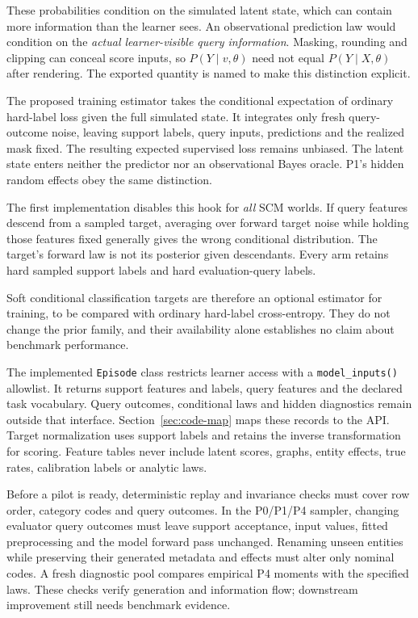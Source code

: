 \documentclass[11pt]{article}
\begin{document}
These probabilities condition on the simulated latent state, which can contain more information than the learner sees. An observational prediction law would condition on the \emph{actual learner-visible query information}. Masking, rounding and clipping can conceal score inputs, so $P(Y\mid v,\theta)$ need not equal $P(Y\mid X,\theta)$ after rendering. The exported quantity is named  to make this distinction explicit.

The proposed training estimator takes the conditional expectation of ordinary hard-label loss given the full simulated state. It integrates only fresh query-outcome noise, leaving support labels, query inputs, predictions and the realized mask fixed. The resulting expected supervised loss remains unbiased. The latent state enters neither the predictor nor an observational Bayes oracle. P1's hidden random effects obey the same distinction.

The first implementation disables this hook for \emph{all} SCM worlds. If query features descend from a sampled target, averaging over forward target noise while holding those features fixed generally gives the wrong conditional distribution. The target's forward law is not its posterior given descendants. Every arm retains hard sampled support labels and hard evaluation-query labels.

Soft conditional classification targets are therefore an optional estimator for training, to be compared with ordinary hard-label cross-entropy. They do not change the prior family, and their availability alone establishes no claim about benchmark performance.

The implemented \texttt{Episode} class restricts learner access with a \texttt{model\_inputs()} allowlist. It returns support features and labels, query features and the declared task vocabulary. Query outcomes, conditional laws and hidden diagnostics remain outside that interface. Section~\ref{sec:code-map} maps these records to the API. Target normalization uses support labels and retains the inverse transformation for scoring. Feature tables never include latent scores, graphs, entity effects, true rates, calibration labels or analytic laws.

Before a pilot is ready, deterministic replay and invariance checks must cover row order, category codes and query outcomes. In the P0/P1/P4 sampler, changing evaluator query outcomes must leave support acceptance, input values, fitted preprocessing and the model forward pass unchanged. Renaming unseen entities while preserving their generated metadata and effects must alter only nominal codes. A fresh diagnostic pool compares empirical P4 moments with the specified laws. These checks verify generation and information flow; downstream improvement still needs benchmark evidence.
\end{document}
